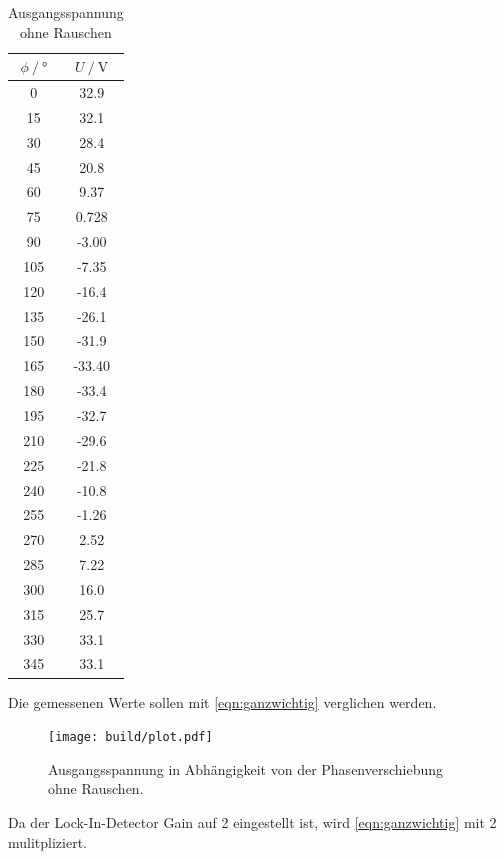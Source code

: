 \begin{table}
  \centering
  \caption{Ausgangsspannung ohne Rauschen}
  \label{tab:ohne_Rauschen}
  \begin{tabular}{cc}
    \toprule {$\phi \:/\: °$} & {$U \:/\: \si{\volt}$} \\
    \midrule
     0  & 32.9  \\
     15  & 32.1  \\
     30 & 28.4 \\
     45 & 20.8 \\
     60 & 9.37 \\
     75 & 0.728\\
     90 & -3.00 \\
     105 & -7.35  \\
     120 & -16.4 \\
     135 & -26.1 \\
     150 & -31.9  \\
     165 & -33.40 \\
     180 & -33.4  \\
     195 & -32.7  \\
     210 & -29.6  \\
     225 & -21.8  \\
     240 & -10.8\\
     255 & -1.26  \\
     270 & 2.52  \\
     285 & 7.22  \\
     300 & 16.0 \\
     315 & 25.7 \\
     330 & 33.1 \\
     345 & 33.1 \\
\bottomrule
\end{tabular}
\end{table}

Die gemessenen Werte sollen mit \ref{eqn:ganzwichtig} verglichen werden.

\begin{figure}
  \centering
  \texttt{[image: build/plot.pdf]}
\caption{Ausgangsspannung in Abhängigkeit von der Phasenverschiebung ohne Rauschen.}
  \label{fig:ohne_rauschen}
\end{figure}
Da der Lock-In-Detector Gain auf 2 eingestellt ist, wird \ref{eqn:ganzwichtig} mit 2 mulitpliziert.


